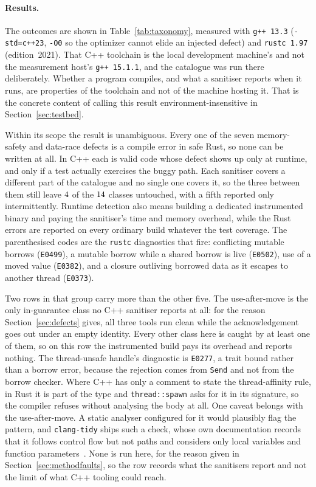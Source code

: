 \documentclass[english,oneside,a4paper,censored,csm,software-track-2020]{HYthesisML}
\begin{document}
\paragraph{Results.}
The outcomes are shown in Table~\ref{tab:taxonomy}, measured with \texttt{g++~13.3}
(\texttt{-std=c++23}, \texttt{-O0} so the optimizer cannot elide an injected defect) and
\texttt{rustc~1.97} (edition~2021). That C++ toolchain is the local development machine's
and not the measurement host's \texttt{g++~15.1.1}, and the catalogue was run there
deliberately. Whether a program compiles, and what a sanitiser reports when it runs, are
properties of the toolchain and not of the machine hosting it. That is the concrete
content of calling this result environment-insensitive in
Section~\ref{sec:testbed}.

Within its scope the result is unambiguous. Every one of
the seven memory-safety and data-race defects is a compile error in safe Rust, so none can be
written at all. In C++ each is valid code whose defect shows up only at runtime, and
only if a test actually exercises the buggy path. Each sanitiser covers a different part of the
catalogue and no single one covers it, so the three between them still leave
$4$ of the $14$ classes untouched, with a fifth reported only
intermittently. Runtime detection also means building a
dedicated instrumented binary and paying the sanitiser's time and memory overhead, while the
Rust errors are reported on every ordinary build whatever the test coverage. The parenthesised
codes are the \texttt{rustc} diagnostics that fire: conflicting mutable borrows
(\texttt{E0499}), a mutable borrow while a shared borrow is live (\texttt{E0502}), use of a moved
value (\texttt{E0382}), and a closure outliving borrowed data as it escapes to another thread
(\texttt{E0373}).

Two rows in that group carry more than the other five. The use-after-move is the only
in-guarantee class no C++ sanitiser reports at all: for the reason Section~\ref{sec:defects}
gives, all three tools run clean while the acknowledgement goes out under an empty identity. Every
other class here is caught by at least one of them, so on this row the instrumented build pays its
overhead and reports nothing. The thread-unsafe handle's diagnostic is \texttt{E0277}, a trait bound
rather than a borrow error, because the rejection comes from \texttt{Send} and not from the borrow
checker. Where C++ has only a comment to state the thread-affinity rule, in Rust it is part of the
type and \texttt{thread::spawn} asks for it in its signature, so the compiler refuses without
analysing the body at all. One caveat belongs with the use-after-move. A static analyser
configured for it would plausibly flag the pattern, and \texttt{clang-tidy} ships such a check,
whose own documentation records that it follows control flow but not
paths and considers only local variables and function
parameters~\cite{clangtidyuseaftermove}. None is run here, for the reason given in
Section~\ref{sec:methodfaults}, so the row records what the sanitisers report and not the limit
of what C++ tooling could reach.
\end{document}
